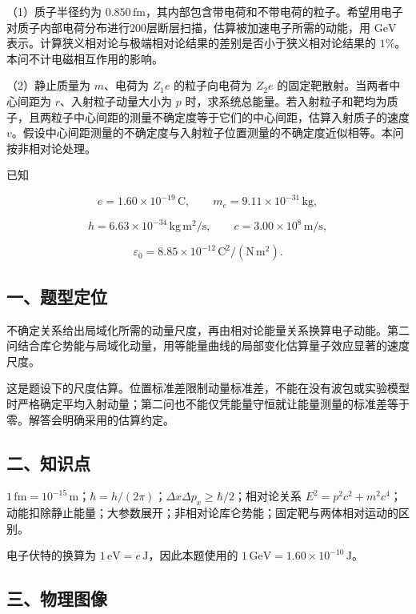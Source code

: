 \documentclass[12pt,a4paper,fontset=fandol]{ctexart}
\begin{document}
（1）质子半径约为
\(0.850\,\mathrm{fm}\)，其内部包含带电荷和不带电荷的粒子。希望用电子对质子内部电荷分布进行200层断层扫描，估算被加速电子所需的动能，用
\(\mathrm{GeV}\)
表示。计算狭义相对论与极端相对论结果的差别是否小于狭义相对论结果的
\(1\%\)。本问不计电磁相互作用的影响。

（2）静止质量为 \(m\)、电荷为 \(Z_1e\) 的粒子向电荷为 \(Z_2e\)
的固定靶散射。当两者中心间距为 \(r\)、入射粒子动量大小为 \(p\)
时，求系统总能量。若入射粒子和靶均为质子，且两粒子中心间距的测量不确定度等于它们的中心间距，估算入射质子的速度
\(v\)。假设中心间距测量的不确定度与入射粒子位置测量的不确定度近似相等。本问按非相对论处理。

已知

\[e=1.60\times10^{-19}\,\mathrm C,
\qquad m_e=9.11\times10^{-31}\,\mathrm{kg},\]

\[h=6.63\times10^{-34}\,\mathrm{kg\,m^2/s},
\qquad c=3.00\times10^8\,\mathrm{m/s},\]

\[\varepsilon_0=8.85\times10^{-12}\,\mathrm{C^2/(N\,m^2)}.\]

\subsection{一、题型定位}\label{ux4e00ux9898ux578bux5b9aux4f4d-3}

不确定关系给出局域化所需的动量尺度，再由相对论能量关系换算电子动能。第二问结合库仑势能与局域化动量，用等能量曲线的局部变化估算量子效应显著的速度尺度。

这是题设下的尺度估算。位置标准差限制动量标准差，不能在没有波包或实验模型时严格确定平均入射动量；第二问也不能仅凭能量守恒就让能量测量的标准差等于零。解答会明确采用的估算约定。

\subsection{二、知识点}\label{ux4e8cux77e5ux8bc6ux70b9-3}

\(1\,\mathrm{fm}=10^{-15}\,\mathrm m\)；\(\hbar=h/(2\pi)\)；\(\Delta x\Delta p_x\ge\hbar/2\)；相对论关系
\(E^2=p^2c^2+m^2c^4\)；动能扣除静止能量；大参数展开；非相对论库仑势能；固定靶与两体相对运动的区别。

电子伏特的换算为 \(1\,\mathrm{eV}=e\,\mathrm J\)，因此本题使用的
\(1\,\mathrm{GeV}=1.60\times10^{-10}\,\mathrm J\)。

\subsection{三、物理图像}\label{ux4e09ux7269ux7406ux56feux50cf-3}
\end{document}
